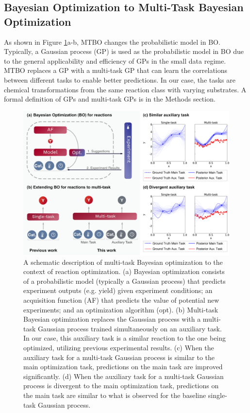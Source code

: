 \subsection{Bayesian Optimization to Multi-Task Bayesian Optimization}


As shown in Figure \ref{fig:multitask_overview}a-b, MTBO changes the probabilistic model in BO. Typically, a Gaussian process (GP) is used as the probabilistic model in BO due to the general applicability and efficiency of GPs in the small data regime.\cite{Snoek2012} MTBO replaces a GP with a multi-task GP that can learn the correlations between different tasks to enable better predictions. In our case, the tasks are chemical transformations from the same reaction class with varying substrates. A formal definition of GPs and multi-task GPs is in the Methods section.

\begin{figure}
    \centering
    \includegraphics[width=1.2\textwidth]{gfx/Chapter04/paper_figure_1.png}
    \caption{A schematic description of multi-task Bayesian optimization to the context of reaction optimization. (a) Bayesian optimization consists of a probabilistic model (typically a Gaussian process) that predicts experiment outputs (e.g. yield) given experiment conditions; an acquisition function (AF) that predicts the value of potential new experiments; and an optimization algorithm (opt). (b) Multi-task Bayesian optimization replaces the Gaussian process with a multi-task Gaussian process trained simultaneously on an auxiliary task. In our case, this auxiliary task is a similar reaction to the one being optimized, utilizing previous experimental results. (c) When the auxiliary task for a multi-task Gaussian process is similar to the main optimization task, predictions on the main task are improved significantly. (d) When the auxiliary task for a multi-task Gaussian process is divergent to the main optimization task, predictions on the main task are similar to what is observed for the baseline single-task Gaussian process.}
    \label{fig:multitask_overview}
\end{figure}

